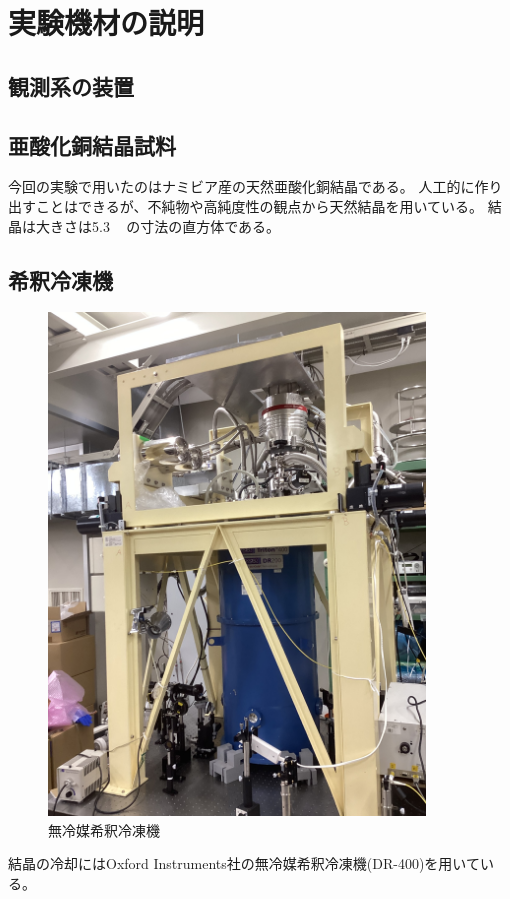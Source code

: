\newpage
\section{実験機材の説明}
\subsection{観測系の装置}
\subsection*{亜酸化銅結晶試料}
今回の実験で用いたのはナミビア産の天然亜酸化銅結晶である。
人工的に作り出すことはできるが、不純物や高純度性の観点から天然結晶を用いている。
結晶は大きさは5.3\, \, \,の寸法の直方体である。

\subsection*{希釈冷凍機}
\begin{figure}[htbp]
\begin{center}
\includegraphics[width=100mm, angle=270]{IMG_8626.jpeg}
\caption{無冷媒希釈冷凍機}
\end{center}
\end{figure}
結晶の冷却にはOxford Instruments社の無冷媒希釈冷凍機(DR-400)を用いている。
